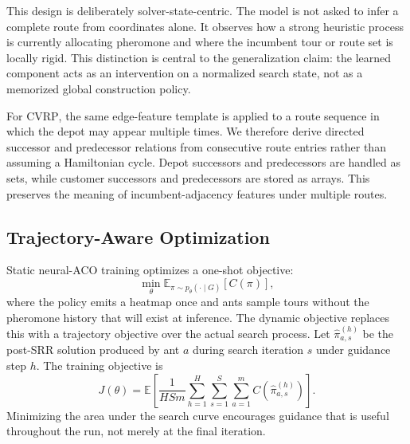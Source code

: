 \documentclass[11pt]{article}
\newcommand{\CVRP}{\textsc{CVRP}}
\newcommand{\SRR}{\textsc{SRR}}
\begin{document}
This design is deliberately solver-state-centric.
The model is not asked to infer a complete route from coordinates alone.
It observes how a strong heuristic process is currently allocating pheromone and where the incumbent tour or route set is locally rigid.
This distinction is central to the generalization claim: the learned component acts as an intervention on a normalized search state, not as a memorized global construction policy.

For \CVRP{}, the same edge-feature template is applied to a route sequence in which the depot may appear multiple times.
We therefore derive directed successor and predecessor relations from consecutive route entries rather than assuming a Hamiltonian cycle.
Depot successors and predecessors are handled as sets, while customer successors and predecessors are stored as arrays.
This preserves the meaning of incumbent-adjacency features under multiple routes.

\subsection{Trajectory-Aware Optimization}
\label{sec:trajectory-training}

Static neural-ACO training optimizes a one-shot objective:
\begin{equation}
\min_\theta
\mathbb{E}_{\pi \sim p_\theta(\cdot \mid G)}
\left[C(\pi)\right],
\end{equation}
where the policy emits a heatmap once and ants sample tours without the pheromone history that will exist at inference.
The dynamic objective replaces this with a trajectory objective over the actual search process.
Let $\hat{\pi}_{a,s}^{(h)}$ be the post-\SRR{} solution produced by ant $a$ during search iteration $s$ under guidance step $h$.
The training objective is
\begin{equation}
J(\theta)
=
\mathbb{E}
\left[
\frac{1}{HS m}
\sum_{h=1}^{H}
\sum_{s=1}^{S}
\sum_{a=1}^{m}
C(\hat{\pi}_{a,s}^{(h)})
\right].
\end{equation}
Minimizing the area under the search curve encourages guidance that is useful throughout the run, not merely at the final iteration.
\end{document}
